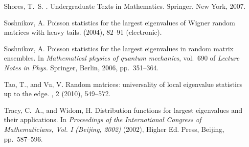 \documentclass[11pt,reqno]{amsart}
\newcommand{\1}{\mathbf{1}}
\newcommand{\0}{\boldsymbol{0}}
\newcommand{\4}{\mathchoice{\mskip1.5mu}{\mskip1.5mu}{}{}}
\newcommand{\5}{\mathchoice{\mskip-1.5mu}{\mskip-1.5mu}{}{}}
\newcommand{\2}{\penalty250\mskip\thickmuskip\mskip-\thinmuskip} %
\begin{document}
\begin{thebibliography}{10}
{\sc Shores, T.~S.}
.
\newblock Undergraduate Texts in Mathematics. Springer, New York, 2007.

{\sc Soshnikov, A.}
\newblock Poisson statistics for the largest eigenvalues of {W}igner random
  matrices with heavy tails.
 (2004), 82--91 (electronic).

{\sc Soshnikov, A.}
\newblock Poisson statistics for the largest eigenvalues in random matrix
  ensembles.
\newblock In {\em Mathematical physics of quantum mechanics}, vol.~690 of {\em
  Lecture Notes in Phys.} Springer, Berlin, 2006, pp.~351--364.

{\sc Tao, T., and Vu, V.}
\newblock Random matrices: universality of local eigenvalue statistics up to
  the edge.
, 2 (2010), 549--572.

{\sc Tracy, C.~A., and Widom, H.}
\newblock Distribution functions for largest eigenvalues and their
  applications.
\newblock In {\em Proceedings of the {I}nternational {C}ongress of
  {M}athematicians, {V}ol. {I} ({B}eijing, 2002)\/} (2002), Higher Ed. Press,
  Beijing, pp.~587--596.

\end{thebibliography}
\end{document}
